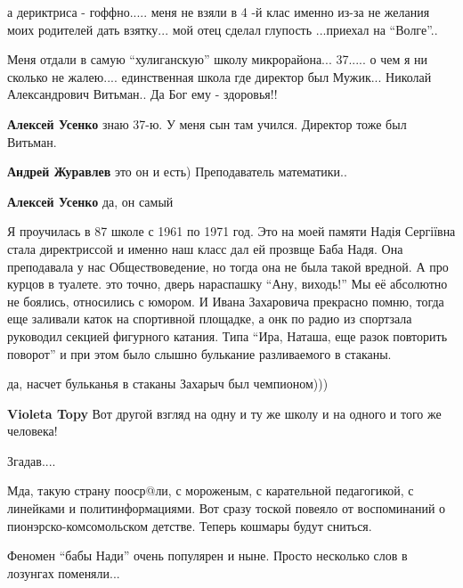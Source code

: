 \begin{itemize}
\begin{itemize}
а дериктриса - гоффно..... меня не взяли в 4 -й клас именно из-за не желания
моих родителей дать взятку... мой отец сделал глупость ...приехал на \enquote{Волге}..


Меня отдали в самую \enquote{хулиганскую} школу микрорайона... 37..... о чем я ни
сколько не жалею.... единственная школа где директор был Мужик... Николай
Александрович Витьман.. Да Бог ему - здоровья!!

\textbf{Алексей Усенко} знаю 37-ю. У меня сын там учился. Директор тоже был Витьман.

\textbf{Андрей Журавлев} это он и есть)
Преподаватель математики..

\textbf{Алексей Усенко} да, он самый
\end{itemize} %


Я проучилась в 87 школе с 1961 по 1971 год. Это на моей памяти Надія Сергіївна
стала директриссой и именно наш класс дал ей прозвще Баба Надя. Она преподавала
у нас Обществоведение, но тогда она не была такой вредной. А про курцов в
туалете. это точно, дверь нараспашку \enquote{Ану, виходь!} Мы её абсолютно не боялись,
относились с юмором. И Ивана Захаровича прекрасно помню, тогда еще заливали
каток на спортивной площадке, а онк по радио из спортзала руководил секцией
фигурного катания. Типа \enquote{Ира, Наташа, еще разок повторить поворот} и при этом
было слышно булькание разливаемого в стаканы.

\begin{itemize} %
да, насчет бульканья в стаканы Захарыч был чемпионом)))

\textbf{Violeta Topy}
Вот другой взгляд на одну и ту же школу и на одного и того же человека!
\end{itemize} %

Згадав....


Мда, такую страну пооср@ли, с мороженым, с карательной педагогикой, с линейками
и политинформациями. Вот сразу тоской повеяло от воспоминаний о
пионэрско-комсомольском детстве. Теперь кошмары будут сниться.

\begin{itemize} %
Феномен \enquote{бабы Нади} очень популярен и ныне. Просто несколько слов в лозунгах поменяли...


\end{itemize}
\end{itemize}
